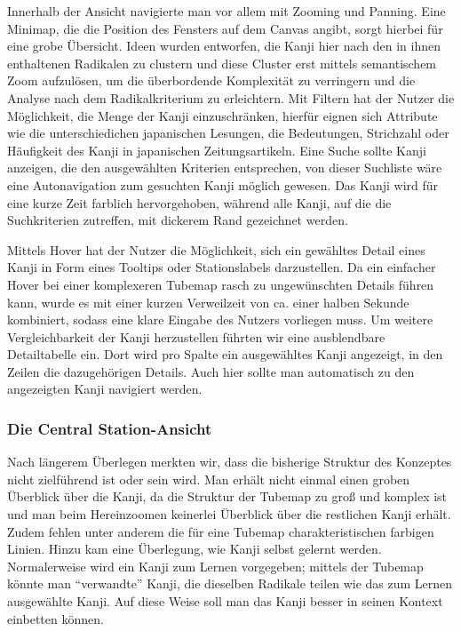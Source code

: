Innerhalb der Ansicht navigierte man vor allem mit Zooming und Panning. Eine Minimap, die die Position des Fensters auf dem Canvas angibt, sorgt hierbei für eine grobe Übersicht. Ideen wurden entworfen, die Kanji hier nach den in ihnen enthaltenen Radikalen zu clustern und diese Cluster erst mittels semantischem Zoom aufzulösen, um die überbordende Komplexität zu verringern und die Analyse nach dem Radikalkriterium zu erleichtern. Mit Filtern hat der Nutzer die Möglichkeit, die Menge der Kanji einzuschränken, hierfür eignen sich Attribute wie die unterschiedichen japanischen Lesungen, die Bedeutungen, Strichzahl oder Häufigkeit des Kanji in japanischen Zeitungsartikeln. Eine Suche sollte Kanji anzeigen, die den ausgewählten Kriterien entsprechen, von dieser Suchliste wäre eine Autonavigation zum gesuchten Kanji möglich gewesen. Das Kanji wird für eine kurze Zeit farblich hervorgehoben, während alle Kanji, auf die die Suchkriterien zutreffen, mit dickerem Rand gezeichnet werden.

Mittels Hover hat der Nutzer die Möglichkeit, sich ein gewähltes Detail eines Kanji in Form eines Tooltips oder Stationslabels darzustellen. Da ein einfacher Hover bei einer komplexeren Tubemap rasch zu ungewünschten Details führen kann, wurde es mit einer kurzen Verweilzeit von ca. einer halben Sekunde kombiniert, sodass eine klare Eingabe des Nutzers vorliegen muss. Um weitere Vergleichbarkeit der Kanji herzustellen führten wir eine ausblendbare Detailtabelle ein. Dort wird pro Spalte ein ausgewähltes Kanji angezeigt, in den Zeilen die dazugehörigen Details. Auch hier sollte man automatisch zu den angezeigten Kanji navigiert werden. 


\subsubsection{Die Central Station-Ansicht}
Nach längerem Überlegen merkten wir, dass die bisherige Struktur des Konzeptes nicht zielführend ist oder sein wird. Man erhält nicht einmal einen groben Überblick über die Kanji, da die Struktur der Tubemap zu groß und komplex ist und man beim Hereinzoomen keinerlei Überblick über die restlichen Kanji erhält. Zudem fehlen unter anderem die für eine Tubemap charakteristischen farbigen Linien. Hinzu kam eine Überlegung, wie Kanji selbst gelernt werden. Normalerweise wird ein Kanji zum Lernen vorgegeben; mittels der Tubemap könnte man "`verwandte"' Kanji, die dieselben Radikale teilen wie das zum Lernen ausgewählte Kanji. Auf diese Weise soll man das Kanji besser in seinen Kontext einbetten können.

